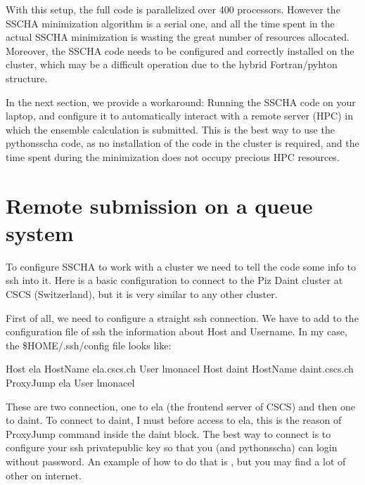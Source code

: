 \documentclass[a4paper,11pt,english]{sphinxmanual}
\begin{document}
\sphinxAtStartPar
With this setup, the full code is parallelized over 400 processors. However the SSCHA minimization algorithm is a serial one, and all the time spent in the actual SSCHA minimization is wasting the great number of resources allocated.
Moreover, the SSCHA code needs to be configured and correctly installed on the cluster, which may be a difficult operation due to the hybrid Fortran/pyhton structure.

\sphinxAtStartPar
In the next section, we provide a workaround: Running the SSCHA code on your laptop, and configure it to automatically interact with a remote server (HPC) in which the ensemble calculation is submitted.
This is the best way to use the python\sphinxhyphen{}sscha code, as no installation of the code in the cluster is required, and the time spent during the minimization does not occupy precious HPC resources.


\section{Remote submission on a queue system}
\label{\detokenize{start:remote-submission-on-a-queue-system}}
\sphinxAtStartPar
To configure SSCHA to work with a cluster we need to tell the code some info to ssh into it.
Here is a basic configuration to connect to the Piz Daint cluster at CSCS (Switzerland), but it is very similar to any other cluster.

\sphinxAtStartPar
First of all, we need to configure a straight ssh connection. We have to add to the configuration file of ssh the information about Host and Username. In my case, the \$HOME/.ssh/config file looks like:

\begin{sphinxVerbatim}[commandchars=\\\{\}]
Host ela
     HostName ela.cscs.ch
     User lmonacel
Host daint
     HostName daint.cscs.ch
     ProxyJump ela
     User lmonacel
\end{sphinxVerbatim}

\sphinxAtStartPar
These are two connection, one to ela (the front\sphinxhyphen{}end server of CSCS) and then one to daint.
To connect to daint, I must before access to ela, this is the reason of ProxyJump command inside the daint block.
The best way to connect is to configure your ssh private\sphinxhyphen{}public key so that you (and python\sphinxhyphen{}sscha) can login without password.
An example of how to do that is , but you may find a lot of other on internet.
\end{document}
